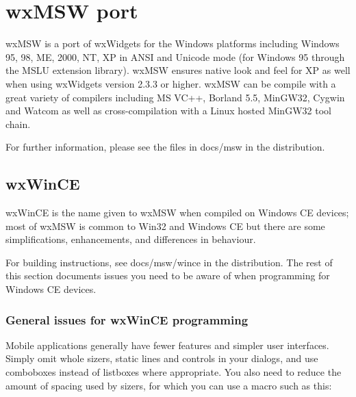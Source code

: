 
\section{wxMSW port}\label{wxmswport}

wxMSW is a port of wxWidgets for the Windows platforms
including Windows 95, 98, ME, 2000, NT, XP in ANSI and
Unicode mode (for Windows 95 through the MSLU extension
library). wxMSW ensures native look and feel for XP
as well when using wxWidgets version 2.3.3 or higher.
wxMSW can be compile with a great variety of compilers
including MS VC++, Borland 5.5, MinGW32, Cygwin and
Watcom as well as cross-compilation with a Linux hosted
MinGW32 tool chain.

For further information, please see the files in docs/msw
in the distribution.

\subsection{wxWinCE}\label{wxwince}

wxWinCE is the name given to wxMSW when compiled on Windows CE devices;
most of wxMSW is common to Win32 and Windows CE but there are
some simplifications, enhancements, and differences in
behaviour.

For building instructions, see docs/msw/wince in the
distribution. The rest of this section documents issues you
need to be aware of when programming for Windows CE devices.

\subsubsection{General issues for wxWinCE programming}

Mobile applications generally have fewer features and
simpler user interfaces. Simply omit whole sizers, static
lines and controls in your dialogs, and use comboboxes instead
of listboxes where appropriate. You also need to reduce
the amount of spacing used by sizers, for which you can
use a macro such as this:

